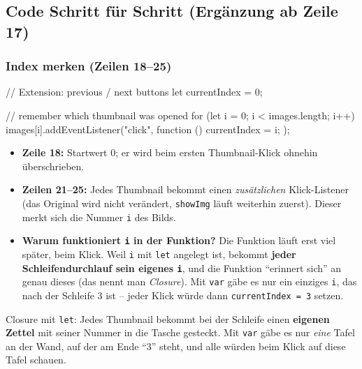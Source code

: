 \documentclass[a4paper,11pt]{article}
\begin{document}
\subsection{Code Schritt für Schritt (Ergänzung ab Zeile 17)}

\subsubsection*{Index merken (Zeilen 18--25)}
\begin{code}[firstnumber=17]
// Extension: previous / next buttons
let currentIndex = 0;

// remember which thumbnail was opened
for (let i = 0; i < images.length; i++) {
   images[i].addEventListener("click", function () {
      currentIndex = i;
   });
}
\end{code}
\begin{itemize}
\item \textbf{Zeile 18:} Startwert 0; er wird beim ersten Thumbnail-Klick ohnehin überschrieben.
\item \textbf{Zeilen 21--25:} Jedes Thumbnail bekommt einen \emph{zusätzlichen} Klick-Listener (das Original wird
      nicht verändert, \texttt{showImg} läuft weiterhin zuerst). Dieser merkt sich die Nummer \texttt{i} des Bilds.
\item \textbf{Warum funktioniert \texttt{i} in der Funktion?} Die Funktion läuft erst viel später, beim Klick. Weil
      \texttt{i} mit \texttt{let} angelegt ist, bekommt \textbf{jeder Schleifendurchlauf sein eigenes \texttt{i}}, und
      die Funktion "`erinnert sich"' an genau dieses (das nennt man \emph{Closure}). Mit \texttt{var} gäbe es nur
      ein einziges \texttt{i}, das nach der Schleife 3 ist -- jeder Klick würde dann \texttt{currentIndex = 3} setzen.
\end{itemize}

\begin{analogie}
Closure mit \texttt{let}: Jedes Thumbnail bekommt bei der Schleife einen \textbf{eigenen Zettel} mit seiner Nummer
in die Tasche gesteckt. Mit \texttt{var} gäbe es nur \emph{eine} Tafel an der Wand, auf der am Ende "`3"' steht,
und alle würden beim Klick auf diese Tafel schauen.
\end{analogie}
\end{document}
